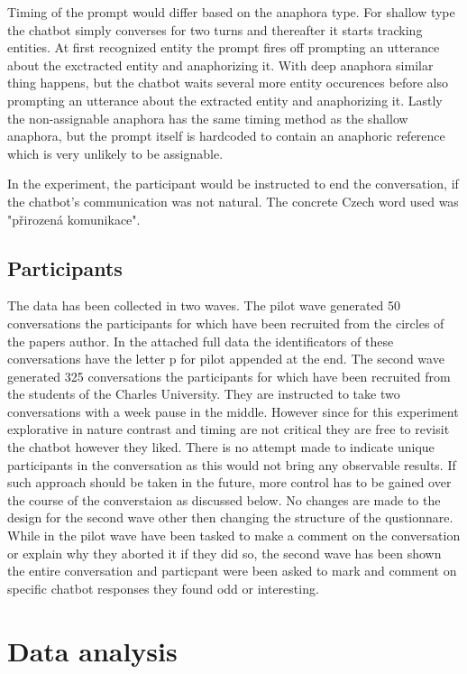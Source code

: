 \documentclass[12pt]{report}
\begin{document}
{Timing of the prompt would differ based on the anaphora type.
For shallow type the chatbot simply converses for two turns and thereafter it starts tracking entities.
At first recognized entity the prompt fires off
prompting an utterance about the exctracted entity and anaphorizing it.
With deep anaphora similar thing happens,
but the chatbot waits several more entity occurences
before also prompting an utterance about the extracted entity and anaphorizing it.
Lastly the non-assignable anaphora has the same timing method as the shallow anaphora,
but the prompt itself is hardcoded to contain an anaphoric reference which is
very unlikely to be assignable.

In the experiment, the participant would be instructed to end the conversation,
if the chatbot's communication was not natural.
The concrete Czech word used was "přirozená komunikace".

\subsection{Participants}
The data has been collected in two waves.
The pilot wave generated 50 conversations
the participants for which have been recruited from the circles of the papers author.
In the attached full data
the identificators of these conversations have
the letter p for pilot appended at the end.
The second wave generated 325 conversations
the participants for which have been recruited from the students of the Charles University.
They are instructed to take two conversations with a week pause in the middle.
However since for this experiment explorative in nature contrast and timing are not critical
they are free to revisit the chatbot however they liked.
There is no attempt made to indicate unique participants in the conversation as
this would not bring any observable results.
If such approach should be taken in the future,
more control has to be gained over the course of the converstaion
as discussed below.
No changes are made to the design for the second wave other then changing the structure of the qustionnare.
While in the pilot wave have been tasked to make a comment on the conversation or
explain why they aborted it if they did so,
the second wave has been shown the entire conversation
and particpant were been asked to mark and comment on specific chatbot responses they found odd or interesting.

\section{Data analysis}

}
\end{document}
